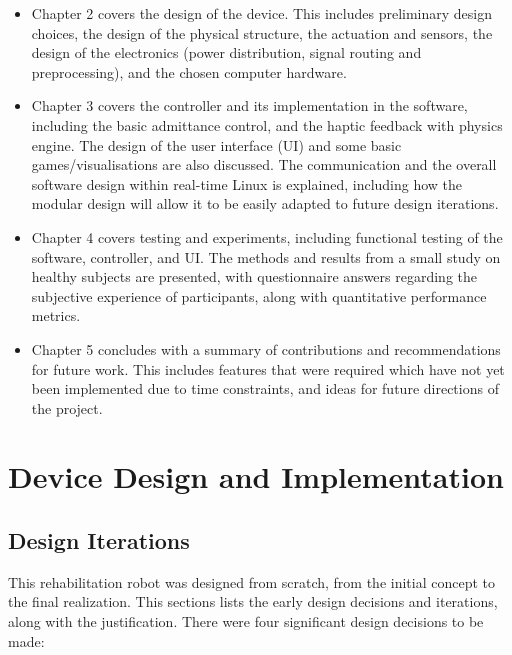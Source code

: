 \documentclass[12pt]{report}
\begin{document}
\begin{itemize}

\item Chapter 2 covers the design of the device. This includes preliminary design choices, the design of the physical structure, the actuation and sensors, the design of the electronics (power distribution, signal routing and preprocessing), and the chosen computer hardware. 

\item Chapter 3 covers the controller and its implementation in the software, including the basic admittance control, and the haptic feedback with physics engine. The design of the user interface (UI) and some basic games/visualisations are also discussed. The communication and the overall software design within real-time Linux is explained, including how the modular design will allow it to be easily adapted to future design iterations. 

\item Chapter 4 covers testing and experiments, including functional testing of the software, controller, and UI. The methods and results from a small study on healthy subjects are presented, with questionnaire answers regarding the subjective experience of participants, along with quantitative performance metrics. 

\item Chapter 5 concludes with a summary of contributions and recommendations for future work. This includes features that were required which have not yet been implemented due to time constraints, and ideas for future directions of the project. 


\end{itemize}


\chapter{Device Design and Implementation} \label{ch2}

	\section{Design Iterations}
	
	This rehabilitation robot was designed from scratch, from the initial concept to the final realization. This sections lists the early design decisions and iterations, along with the justification. There were four significant design decisions to be made:
	
\end{document}
